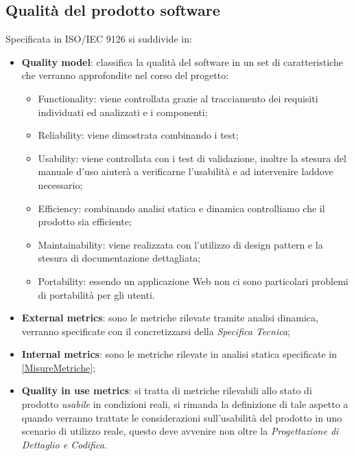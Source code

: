 	\subsection{Qualità del prodotto software}
	\label{appendice-qualitaDelProdotto}
	Specificata in ISO/IEC 9126 si suddivide in:
	
	\begin{itemize}
		\item \textbf{Quality model}: classifica la qualità del software in un set di caratteristiche che verranno approfondite nel corso del progetto:
			
		\begin{itemize}
			\item Functionality: viene controllata grazie al tracciamento dei requisiti individuati ed analizzati e i componenti;
			\item Reliability: viene dimostrata combinando i test;
			\item Usability: viene controllata con i test di validazione, inoltre la stesura del manuale d'uso aiuterà a verificarne l'usabilità e ad intervenire laddove necessario;
			\item Efficiency: combinando analisi statica e dinamica controlliamo che il prodotto sia efficiente;
			\item Maintainability: viene realizzata con l'utilizzo di design pattern e la stesura di documentazione dettagliata;
			\item Portability: essendo  un applicazione Web non ci sono particolari problemi di portabilità per gli utenti.
		\end{itemize}

		\item \textbf{External metrics}: sono le metriche rilevate tramite analisi dinamica, verranno specificate con il concretizzarsi della \emph{Specifica Tecnica};
		\item \textbf{Internal metrics}: sono le metriche rilevate in analisi statica specificate in \ref{MisureMetriche};
		\item \textbf{Quality in use metrics}: si tratta di metriche rilevabili allo stato di prodotto \emph{usabile} in condizioni reali, si rimanda la definizione di tale aspetto a quando verranno trattate le considerazioni sull'usabilità del prodotto in uno scenario di utilizzo reale, questo deve avvenire non oltre la \emph{Progettazione di Dettaglio e Codifica}.
	\end{itemize}


